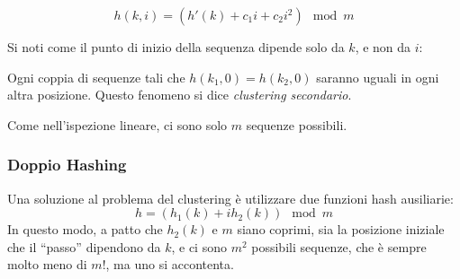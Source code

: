 \documentclass[a4paper,10pt]{article}
\theoremstyle{definition}
\begin{document}
\[h(k, i) = (h'(k) + c_1 i + c_2 i^2)\mod m\]

Si noti come il punto di inizio della sequenza dipende solo da $k$, e non da $i$:\smallskip

Ogni coppia di sequenze tali che $h(k_1, 0) = h(k_2, 0)$ saranno uguali in ogni altra posizione. Questo fenomeno si dice \emph{clustering secondario}. \bigskip

Come nell'ispezione lineare, ci sono solo $m$ sequenze possibili.

\subsubsection{Doppio Hashing}

Una soluzione al problema del clustering è utilizzare due funzioni hash ausiliarie:
\[h = (h_1(k) + ih_2(k))\mod m\]
In questo modo, a patto che $h_2(k)$ e $m$ siano coprimi, sia la posizione iniziale che il ``passo'' dipendono da $k$, e ci sono $m^2$ possibili sequenze, che è sempre molto meno di $m!$, ma uno si accontenta.
\end{document}
